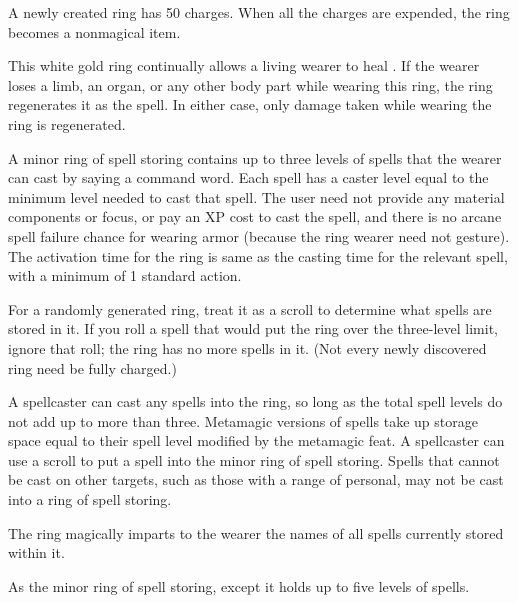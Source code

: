 A newly created ring has 50 charges. When all the charges are expended, the ring becomes a nonmagical item.


 This white gold ring continually allows a living wearer to heal . If the wearer loses a limb, an organ, or any other body part while wearing this ring, the ring regenerates it as the spell. In either case, only damage taken while wearing the ring is regenerated.


 A minor ring of spell storing contains up to three levels of spells that the wearer can cast by saying a command word. Each spell has a caster level equal to the minimum level needed to cast that spell. The user need not provide any material components or focus, or pay an XP cost to cast the spell, and there is no arcane spell failure chance for wearing armor (because the ring wearer need not gesture). The activation time for the ring is same as the casting time for the relevant spell, with a minimum of 1 standard action.

For a randomly generated ring, treat it as a scroll to determine what spells are stored in it. If you roll a spell that would put the ring over the three-level limit, ignore that roll; the ring has no more spells in it. (Not every newly discovered ring need be fully charged.)

A spellcaster can cast any spells into the ring, so long as the total spell levels do not add up to more than three. Metamagic versions of spells take up storage space equal to their spell level modified by the metamagic feat. A spellcaster can use a scroll to put a spell into the minor ring of spell storing. Spells that cannot be cast on other targets, such as those with a range of personal, may not be cast into a ring of spell storing.

The ring magically imparts to the wearer the names of all spells currently stored within it.


 As the minor ring of spell storing, except it holds up to five levels of spells.


